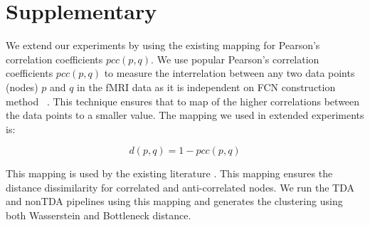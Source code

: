 \section{Supplementary}

We extend our experiments by using the existing mapping for Pearson’s correlation coefficients $pcc(p, q)$. We use popular Pearson’s correlation coefficients $pcc(p, q)$ to measure the interrelation between any two data points (nodes) $p$ and $q$ in the fMRI data as it is independent on FCN construction method ~\cite{smith2011network}. This technique ensures that to map of the higher correlations between the data points to a smaller value. The mapping we used in extended experiments is:

\[
\mathit{d(p, q)} = 
1 - pcc(p, q)
\]

This mapping is used by the existing literature \cite{smith2011network, 7164127,lee2011discriminative, 6307875, edelsbrunner2008persistent}. This mapping ensures the distance dissimilarity for correlated and anti-correlated nodes. We run the TDA and nonTDA pipelines using this mapping and generates the clustering using both Wasserstein and Bottleneck distance.

